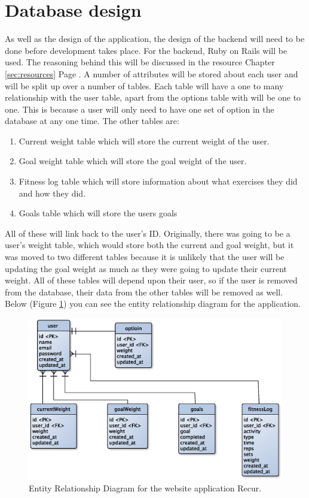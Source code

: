 \section{Database design}
As well as the design of the application, the design of the backend will need to be done before development takes place. For the backend, Ruby on Rails \citep{rails:2013} will be used. The reasoning behind this will be discussed in the resource Chapter \ref{sec:resources} Page \pageref{sec:resources}. A number of attributes will be stored about each user and will be split up over a number of tables. Each table will have a one to many relationship with the user table, apart from the options table with will be one to one. This is because a user will only need to have one set of option in the database at any one time. The other tables are:

\begin{enumerate}
\item Current weight table which will store the current weight of the user.
\item Goal weight table which will store the goal weight of the user.
\item Fitness log table which will store information about what exercises they did and how they did.
\item Goals table which will store the users goals
\end{enumerate}

\noindent
All of these will link back to the user's ID. Originally, there was going to be a user's weight table, which would store both the current and goal weight, but it was moved to two different tables because it is unlikely that the user will be updating the goal weight as much as they were going to update their current weight. All of these tables will depend upon their user, so if the user is removed from the database, their data from the other tables will be removed as well. Below (Figure \ref{fig:erd}) you can see the entity relationship diagram for the application.

\begin{figure}[!ht]
\centering
\includegraphics[scale=0.5]{chapters/figs/erd}
\caption{Entity Relationship Diagram for the website application Recur.}
\label{fig:erd}
\end{figure}

